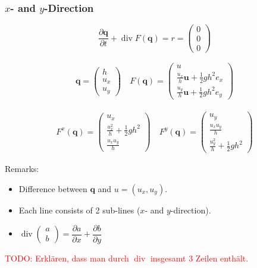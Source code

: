 \documentclass{beamer}
\newcommand{\todo}[1]{\textcolor{red}{TODO: #1}}
\newcommand{\pd}[2]{\dfrac{\partial #1}{\partial #2}}
\DeclareMathOperator{\divergence}{div}
\begin{document}
\begin{frame}
  \frametitle{$x$- and $y$-Direction}

  \begin{equation*}
    \pd{\mathbf{q}}{t} + \divergence F(\mathbf{q}) = r = \begin{pmatrix}
      0 \\ 0\\ 0
    \end{pmatrix}
  \end{equation*}

  \begin{eqnarray*}
    \mathbf{q} =
    \begin{pmatrix}
      h \\ u_x \\ u_y
    \end{pmatrix} \quad F(\mathbf{q}) =
    \begin{pmatrix}
      u \\ \frac{u_x}{h} \mathbf{u} + \frac{1}{2} g h^2 e_x \\ \frac{u_y}{h} \mathbf{u} +
      \frac{1}{2} g h^2 e_y
    \end{pmatrix}
  \end{eqnarray*}

  \begin{eqnarray*}
    F^x(\mathbf{q}) =
    \begin{pmatrix}
      u_x \\ \frac{u_x^2}{h} + \frac{1}{2} g h^2 \\ \frac{u_x u_y}{h}
    \end{pmatrix}
    \quad
    F^y(\mathbf{q}) =
    \begin{pmatrix}
      u_y \\ \frac{u_x u_y}{h} \\ \frac{u_y^2}{h} + \frac{1}{2} g h^2
    \end{pmatrix}
  \end{eqnarray*}
  
  \begin{block}{Remarks:}
    \begin{itemize}
    \item Difference between $\mathbf{q}$ and $u=(u_x,u_y)$.
    \item Each line consists of 2 sub-lines ($x$- and $y$-direction).
    \item $\divergence
      \begin{pmatrix}
        a \\ b
      \end{pmatrix} = \pd{a}{x} + \pd{b}{y}$
    \end{itemize}
  \end{block}
  \todo{Erklären, dass man durch $\divergence$ insgesamt 3 Zeilen enthält.}
  
\end{frame}
\end{document}

